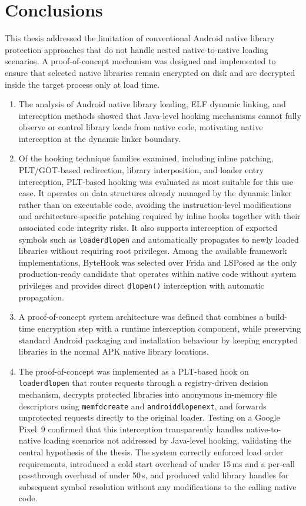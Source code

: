 \documentclass[11pt,a4paper]{report}
\renewcommand\_{{\textunderscore\allowbreak}}
\begin{document}
\newpage

\section*{Conclusions}

This thesis addressed the limitation of conventional Android native library protection approaches that do not handle nested native-to-native loading scenarios. A proof-of-concept mechanism was designed and implemented to ensure that selected native libraries remain encrypted on disk and are decrypted inside the target process only at load time.

\begin{enumerate}
    \item The analysis of Android native library loading, ELF dynamic linking, and interception methods showed that Java-level hooking mechanisms cannot fully observe or control library loads from native code, motivating native interception at the dynamic linker boundary.
    \item Of the hooking technique families examined, including inline patching, PLT/GOT-based redirection, library interposition, and loader entry interception, PLT-based hooking was evaluated as most suitable for this use case. It operates on data structures already managed by the dynamic linker rather than on executable code, avoiding the instruction-level modifications and architecture-specific patching required by inline hooks together with their associated code integrity risks. It also supports interception of exported symbols such as \texttt{\_\_loader\_dlopen} and automatically propagates to newly loaded libraries without requiring root privileges. Among the available framework implementations, ByteHook was selected over Frida and LSPosed as the only production-ready candidate that operates within native code without system privileges and provides direct \texttt{dlopen()} interception with automatic propagation.
    \item A proof-of-concept system architecture was defined that combines a build-time encryption step with a runtime interception component, while preserving standard Android packaging and installation behaviour by keeping encrypted libraries in the normal APK native library locations.
    \item The proof-of-concept was implemented as a PLT-based hook on \texttt{\_\_loader\_dlopen} that routes requests through a registry-driven decision mechanism, decrypts protected libraries into anonymous in-memory file descriptors using \texttt{memfd\_create} and \texttt{android\_dlopen\_ext}, and forwards unprotected requests directly to the original loader. Testing on a Google Pixel~9 confirmed that this interception transparently handles native-to-native loading scenarios not addressed by Java-level hooking, validating the central hypothesis of the thesis. The system correctly enforced load order requirements, introduced a cold start overhead of under 15\,ms and a per-call passthrough overhead of under 50\,\textmu s, and produced valid library handles for subsequent symbol resolution without any modifications to the calling native code.
\end{enumerate}
\end{document}
